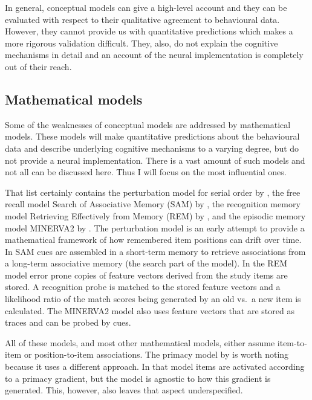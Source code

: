 In general, conceptual models can give a high-level account and they can be evaluated with respect to their qualitative agreement to behavioural data.
However, they cannot provide us with quantitative predictions which makes a more rigorous validation difficult.
They, also, do not explain the cognitive mechanisms in detail and an account of the neural implementation is completely out of their reach.


\subsection{Mathematical models}
Some of the weaknesses of conceptual models are addressed by mathematical models.
These models will make quantitative predictions about the behavioural data and describe underlying cognitive mechanisms to a varying degree, but do not provide a neural implementation.
There is a vast amount of such models and not all can be discussed here.
Thus I will focus on the most influential ones.

That list certainly contains the perturbation model for serial order by \textcite{Estes1972}, the free recall model Search of Associative Memory (SAM) by \textcite{Raaijmakers1981}, the recognition memory model Retrieving Effectively from Memory (REM) by \textcite{Shiffrin1997}, and the episodic memory model MINERVA2 by \textcite{Hintzman1988}.
The perturbation model is an early attempt to provide a mathematical framework of how remembered item positions can drift over time.
In SAM cues are assembled in a short-term memory to retrieve associations from a long-term associative memory (the search part of the model).
In the REM model error prone copies of feature vectors derived from the study items are stored.
A recognition probe is matched to the stored feature vectors and a likelihood ratio of the match scores being generated by an old vs.\ a new item is calculated.
The MINERVA2 model also uses feature vectors that are stored as traces and can be probed by cues.

All of these models, and most other mathematical models, either assume item-to-item or position-to-item associations.
The primacy model by \textcite{Page1998} is worth noting because it uses a different approach.
In that model items are activated according to a primacy gradient, but the model is agnostic to how this gradient is generated.
This, however, also leaves that aspect underspecified.


